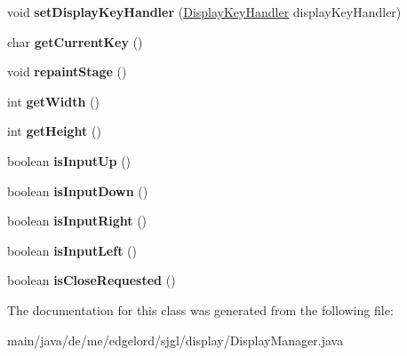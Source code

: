 \begin{DoxyCompactItemize}
\mbox{\label{classde_1_1me_1_1edgelord_1_1sjgl_1_1display_1_1_display_manager_a209c97d1cdc3b39cffdd0a6f528c02fc}} 
void {\bfseries set\+Display\+Key\+Handler} (\mbox{\hyperlink{interfacede_1_1me_1_1edgelord_1_1sjgl_1_1input_1_1_display_key_handler}{Display\+Key\+Handler}} display\+Key\+Handler)
\item 
\mbox{\label{classde_1_1me_1_1edgelord_1_1sjgl_1_1display_1_1_display_manager_ad059deb6fc2fa140f16b66c6ecc78211}} 
char {\bfseries get\+Current\+Key} ()
\item 
\mbox{\label{classde_1_1me_1_1edgelord_1_1sjgl_1_1display_1_1_display_manager_abeb35576ab357b1c7b1225e29ef78da8}} 
void {\bfseries repaint\+Stage} ()
\item 
\mbox{\label{classde_1_1me_1_1edgelord_1_1sjgl_1_1display_1_1_display_manager_ac0da281cdea7eb33e8a7d3d9bf6b4466}} 
int {\bfseries get\+Width} ()
\item 
\mbox{\label{classde_1_1me_1_1edgelord_1_1sjgl_1_1display_1_1_display_manager_a46c9ba8f9f651d09cb2b26735dea25f0}} 
int {\bfseries get\+Height} ()
\item 
\mbox{\label{classde_1_1me_1_1edgelord_1_1sjgl_1_1display_1_1_display_manager_a2aac593a1d00be7b1731de2bc3965eea}} 
boolean {\bfseries is\+Input\+Up} ()
\item 
\mbox{\label{classde_1_1me_1_1edgelord_1_1sjgl_1_1display_1_1_display_manager_a4d3b864aa85ef8505b639ae50fc8d827}} 
boolean {\bfseries is\+Input\+Down} ()
\item 
\mbox{\label{classde_1_1me_1_1edgelord_1_1sjgl_1_1display_1_1_display_manager_a934a709c13e798b4203903e771b78c42}} 
boolean {\bfseries is\+Input\+Right} ()
\item 
\mbox{\label{classde_1_1me_1_1edgelord_1_1sjgl_1_1display_1_1_display_manager_ab453fc44120a09fcab4925092955b585}} 
boolean {\bfseries is\+Input\+Left} ()
\item 
\mbox{\label{classde_1_1me_1_1edgelord_1_1sjgl_1_1display_1_1_display_manager_a1021987d28e34f29b49e63c2138f0b60}} 
boolean {\bfseries is\+Close\+Requested} ()
\end{DoxyCompactItemize}


The documentation for this class was generated from the following file\+:\begin{DoxyCompactItemize}
\item 
main/java/de/me/edgelord/sjgl/display/Display\+Manager.\+java\end{DoxyCompactItemize}
